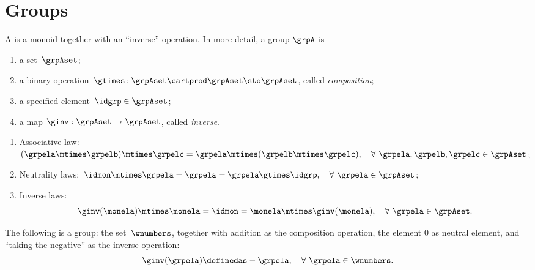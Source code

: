 \section{Groups}
\label{sec:groups}

\begin{ctdefinition}[Group]
  \label{def:group}
  A \emph{} is a monoid together with an ``inverse'' operation.
  In more detail, a group $\grpA$ is
  \begin{body}
    \constit
    \begin{enumerate}
      \item a set~$\grpAset$;
      \item a binary operation~$\gtimes \colon \grpAset \cartprod \grpAset \sto \grpAset$, called \emph{composition};
      \item a specified element~$\idgrp \in \grpAset$;
      \item a map $\ginv: \grpAset \to \grpAset$, called \emph{inverse}.
    \end{enumerate}
    \condit
    \begin{enumerate}
      \item Associative law:~$(\grpela\mtimes \grpelb)\mtimes \grpelc=\grpela\mtimes (\grpelb\mtimes \grpelc), \quad \forall \  \grpela, \grpelb, \grpelc \in \grpAset$;
      \item Neutrality laws:~$\idmon\mtimes \grpela=\grpela=\grpela \gtimes \idgrp, \quad \forall \  \grpela \in \grpAset$;
      \item Inverse laws:
      \begin{equation}
        \label{eq:group-inverse-law}
        \ginv(\monela) \mtimes \monela = \idmon = \monela \mtimes \ginv(\monela), \quad \forall \  \grpela  \in \grpAset.
      \end{equation}
    \end{enumerate}
  \end{body}
\end{ctdefinition}
\begin{example}
  The following is a group: the set~$\wnumbers$, together with addition as the composition operation, the element $0$ as neutral element, and ``taking the negative'' as the inverse operation:
  \begin{equation}
    \ginv(\grpela) \definedas -\grpela, \quad \forall \ \grpela \in \wnumbers.
  \end{equation}
\end{example}
